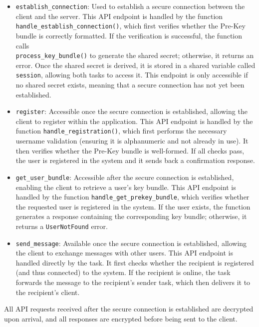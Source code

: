 \begin{itemize}
    \item \texttt{establish\_connection}: Used to establish a secure connection between the client and the server. This API endpoint is handled by the function \\
    \texttt{handle\_establish\_connection()}, which first verifies whether the Pre-Key bundle is correctly formatted. If the verification is successful, the function calls  \\
    \texttt{process\_key\_bundle()} to generate the shared secret; otherwise, it returns an error. Once the shared secret is derived, it is stored in a shared variable called \texttt{session}, allowing both tasks to access it. This endpoint is only accessible if no shared secret exists, meaning that a secure connection has not yet been established.

    \item \texttt{register}: Accessible once the secure connection is established, allowing the client to register within the application. This API endpoint is handled by the function \texttt{handle\_registration()}, which first performs the necessary username validation (ensuring it is alphanumeric and not already in use). It then verifies whether the Pre-Key bundle is well-formed. If all checks pass, the user is registered in the system and it sends back a confirmation response.

    \item \texttt{get\_user\_bundle}: Accessible after the secure connection is established, enabling the client to retrieve a user's key bundle. This API endpoint is handled by the function \texttt{handle\_get\_prekey\_bundle}, which verifies whether the requested user is registered in the system. If the user exists, the function generates a response containing the corresponding key bundle; otherwise, it returns a \texttt{UserNotFound} error.

    \item \texttt{send\_message}: Available once the secure connection is established, allowing the client to exchange messages with other users. This API endpoint is handled directly by the task. It first checks whether the recipient is registered (and thus connected) to the system. If the recipient is online, the task forwards the message to the recipient's sender task, which then delivers it to the recipient's client.
\end{itemize}

All API requests received after the secure connection is established are decrypted upon arrival, and all responses are encrypted before being sent to the client. 

